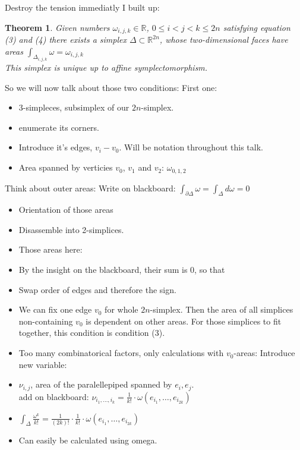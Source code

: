 \documentclass[12pt,a4paper]{scrartcl}
\newtheorem{theorem}{Theorem}[subsection]
\begin{document}
Destroy the tension immediatly I built up:

\begin{theorem}
  Given numbers \( \omega_{i,j,k} \in \mathbb{R} \), \( 0 \leq i < j < k \leq 2n \) satisfying equation (3) and (4)
  there exists a simplex \( \Delta \subset \mathbb{R}^{2n} \), whose two-dimensional faces have areas \( \int_{\Delta_{i,j,k}} \omega = \omega_{i,j,k} \)\\
  This simplex is unique up to affine symplectomorphism.
\end{theorem}

So we will now talk about those two conditions: First one:

\begin{itemize}
  \item \( 3 \)-simpleces, subsimplex of our \( 2n \)-simplex.
  \item enumerate its corners.
  \item Introduce it's edges, \( v_i - v_0 \). Will be notation throughout this talk.
  \item Area spanned by verticies \( v_0 \), \( v_1 \) and \( v_2 \): \( \omega_{0,1,2} \)
\end{itemize}

Think about outer areas: Write on blackboard:
\( \int_{\partial\Delta} \omega = \int_\Delta d \omega = 0 \)

\begin{itemize}
  \item Orientation of those areas
  \item Disassemble into 2-simplices.
  \item Those areas here:
  \item By the insight on the blackboard, their sum is \( 0 \), so that
  \item Swap order of edges and therefore the sign.
  \item We can fix one edge \( v_0 \) for whole \( 2n \)-simplex. Then the area of all simplices non-containing \( v_0 \) is dependent on other areas. For those simplices to fit together, this condition is condition (3).
  \item Too many combinatorical factors, only calculations with \( v_0 \)-areas: Introduce new variable:
  \item \( \nu_{i,j} \), area of the paralellepiped spanned by \( e_i, e_j \).\\
    add on blackboard: \( \nu_{i_1,\dots,i_k} = \frac{1}{k!} \cdot \omega \left( e_{i_1}, \dots, e_{i_{2k}} \right) \)
  \item \( \int_{\Delta} \frac{\omega^k}{k!} = \frac{1}{\left( 2k \right) !} \cdot \frac{1}{k!} \cdot \omega \left( e_{i_1}, \dots, e_{i_{2k}} \right) \)
  \item Can easily be calculated using omega.
\end{itemize}
\end{document}
